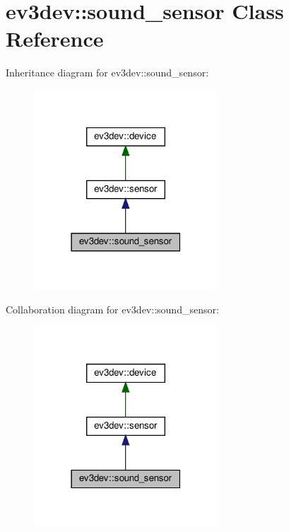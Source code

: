 \hypertarget{classev3dev_1_1sound__sensor}{}\section{ev3dev\+:\+:sound\+\_\+sensor Class Reference}
\label{classev3dev_1_1sound__sensor}


Inheritance diagram for ev3dev\+:\+:sound\+\_\+sensor\+:
\nopagebreak
\begin{figure}[H]
\begin{center}
\leavevmode
\includegraphics[width=195pt]{classev3dev_1_1sound__sensor__inherit__graph}
\end{center}
\end{figure}


Collaboration diagram for ev3dev\+:\+:sound\+\_\+sensor\+:
\nopagebreak
\begin{figure}[H]
\begin{center}
\leavevmode
\includegraphics[width=195pt]{classev3dev_1_1sound__sensor__coll__graph}
\end{center}
\end{figure}
